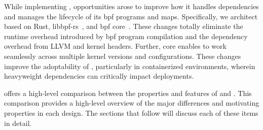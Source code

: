 While implementing \bpfcontain{}, opportunities arose to improve how it handles
dependencies and manages the lifecycle of its \gls{bpf} programs and maps. Specifically,
we architect \bpfcontain{} based on Rust, libbpf-rs~\cite{libbpf-rs}, and \gls{bpf}
\gls{core}~\cite{nakryiko2020_core}. These changes totally eliminate the runtime overhead
introduced by \gls{bpf} program compilation and the dependency overhead from LLVM and
kernel headers. Further, \gls{core} enables \bpfcontain{} to work seamlessly across
multiple kernel versions and configurations. These changes improve the adoptability of
\bpfcontain{}, particularly in containerized environments, wherein heavyweight
dependencies can critically impact deployments.

 offers a high-level comparison between the properties and
features of \bpfbox{} and \bpfcontain{}. This comparison provides a high-level overview of
the major differences and motivating properties in each design. The sections that follow
will discuss each of these items in detail.

